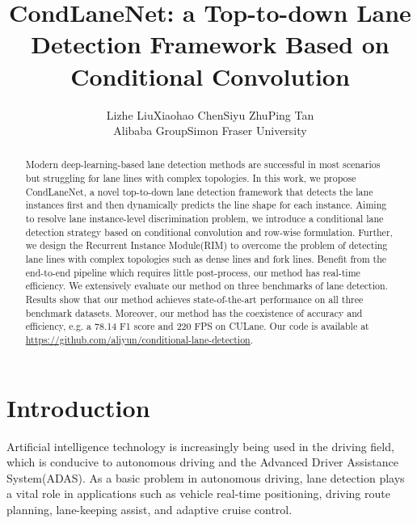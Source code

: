 \documentclass[10pt,twocolumn,letterpaper]{article}
\begin{document}
\title{CondLaneNet: a Top-to-down Lane Detection Framework Based on Conditional Convolution}

\author{Lizhe Liu\hspace{1cm}Xiaohao Chen\hspace{1cm}Siyu Zhu\hspace{1cm}Ping Tan\\
Alibaba Group\hspace{1.5cm}Simon Fraser University\hspace{0cm}
}


\maketitle
\ificcvfinal\thispagestyle{empty}\fi

\def\thefootnote{*}
\begin{abstract}
Modern deep-learning-based lane detection methods are successful in most scenarios but struggling for lane lines with complex topologies.
In this work, we propose CondLaneNet, a novel top-to-down lane detection framework that detects the lane instances first and then dynamically predicts the line shape for each instance. Aiming to resolve lane instance-level discrimination problem, we introduce a conditional lane detection strategy based on conditional convolution and row-wise formulation. Further, we design the Recurrent Instance Module(RIM) to overcome the problem of detecting lane lines with complex topologies such as dense lines and fork lines. 
Benefit from the end-to-end pipeline which requires little post-process, our method has real-time efficiency.
We extensively evaluate our method on three benchmarks of lane detection. Results show that our method achieves state-of-the-art performance on all three benchmark datasets. Moreover, our method has the coexistence of accuracy and efficiency, e.g. a 78.14 F1 score and 220 FPS on CULane. 
Our code is available at  \url{https://github.com/aliyun/conditional-lane-detection}. 

\end{abstract}



\section{Introduction}
Artificial intelligence technology is increasingly being used in the driving field, which is conducive to autonomous driving and the Advanced Driver Assistance System(ADAS). As a basic problem in autonomous driving, lane detection plays a vital role in applications such as vehicle real-time positioning, driving route planning, lane-keeping assist, and adaptive cruise control.
\end{document}
